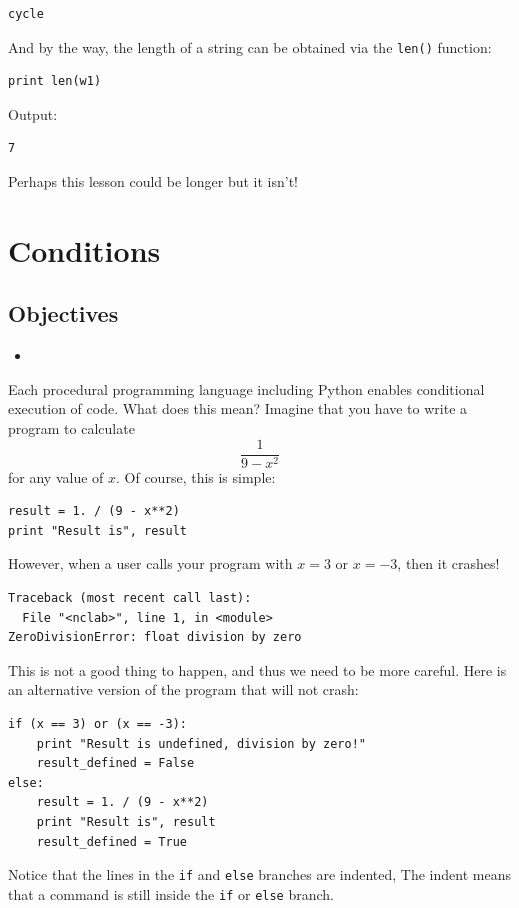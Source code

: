 \begin{verbatim}
cycle
\end{verbatim}
And by the way, the length of a string can be obtained via the {\tt len()} function:

\begin{verbatim}
print len(w1)
\end{verbatim}
Output:

\begin{verbatim}
7
\end{verbatim}
Perhaps this lesson could be longer but it isn't!

\section{Conditions}

\subsection{Objectives}

\begin{itemize}
\item
\end{itemize}

Each procedural programming language including Python enables conditional 
execution of code. What does this mean? Imagine that you have to write
a program to calculate
$$
\frac{1}{9 - x^2}
$$
for any value of $x$. Of course, this is simple:

\begin{verbatim}
result = 1. / (9 - x**2)
print "Result is", result
\end{verbatim}
However, when a user calls your program with $x = 3$ or $x = -3$, then
it crashes!

\begin{verbatim}
Traceback (most recent call last):
  File "<nclab>", line 1, in <module>
ZeroDivisionError: float division by zero
\end{verbatim}
This is not a good thing to happen, and thus we need to be more careful.
Here is an alternative version of the program that will not crash:

\begin{verbatim}
if (x == 3) or (x == -3):
    print "Result is undefined, division by zero!"
    result_defined = False
else:
    result = 1. / (9 - x**2)
    print "Result is", result
    result_defined = True
\end{verbatim}
Notice that the lines in the {\tt if} and {\tt else} branches are indented,
The indent means that a command is still inside the {\tt if} or {\tt else}
branch.

